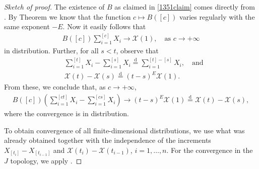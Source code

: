 \documentclass[reqno]{amsart}
\theoremstyle{remark}
\numberwithin{equation}{section} %
\newcommand{\1}{\mathds{1}}
\begin{document}
	\begin{proof}[Sketch of proof]
		The existence of $B$ as claimed in \eqref{1351claim} comes directly from \cite[Theorem 8.1.5]{meerschaert2001limit}. By Theorem \cite[Theorem 4.2.9]{meerschaert2001limit} we know that the function $c \mapsto B([c])$ varies regularly with the same exponent $-E$. Now it easily follows that
		\begin{align}
			B([c])\sum_{i=1}^{[c]} X_i  \to \mathcal{X}(1),\quad \text{as $c\to+\infty$}
		\end{align}
		in distribution. Further, for all $s <t$, observe that
		\begin{align}
			& \sum_{i=1}^{[t]} X_i - \sum_{i=1}^{[s]} X_i \stackrel{\text{d}}{=} \sum_{i=1}^{[t]-[s]} X_i,\quad \text{and}   \\
			& \mathcal{X}(t)-\mathcal{X}(s) \stackrel{\text{d}}{=} (t-s)^E \mathcal{X}(1).
		\end{align}
		From these, we conclude that, as $c\to+\infty$,
		\begin{align}
			B([c])\left(\sum_{i=1}^{[ct]} X_i - \sum_{i=1}^{[cs]} X_i\right) \to (t-s)^E \mathcal{X}(1) \stackrel{\text{d}}{=} \mathcal{X}(t)-\mathcal{X}(s),
		\end{align}
		where the convergence is in distribution.
		
		To obtain convergence of all finite-dimensional distributions, we use what was already obtained together with the independence of the increments $X_{[t_i]}-X_{[t_{i-1}]}$ and $\mathcal{X}(t_i)-\mathcal{X}(t_{i-1})$, $i=1, \dots, n$. For the convergence in the $J$ topology, we apply \cite[Theorem 4.1]{Meerschaert2004}.
	\end{proof}
	
\end{document}

